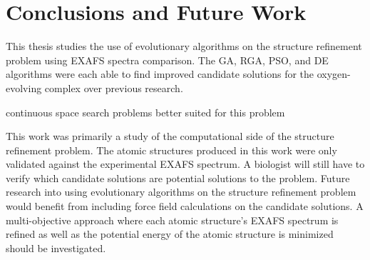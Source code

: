 \chapter{Conclusions and Future Work}

This thesis studies the use of evolutionary algorithms on the structure refinement problem using EXAFS spectra comparison. The GA, RGA, PSO, and DE algorithms were each able to find improved candidate solutions for the oxygen-evolving complex over previous research.

continuous space search problems better suited for this problem

This work was primarily a study of the computational side of the structure refinement problem. The atomic structures produced in this work were only validated against the experimental EXAFS spectrum. A biologist will still have to verify which candidate solutions are potential solutions to the problem. Future research into using evolutionary algorithms on the structure refinement problem would benefit from including force field calculations on the candidate solutions. A multi-objective approach where each atomic structure's EXAFS spectrum is refined as well as the potential energy of the atomic structure is minimized should be investigated.
